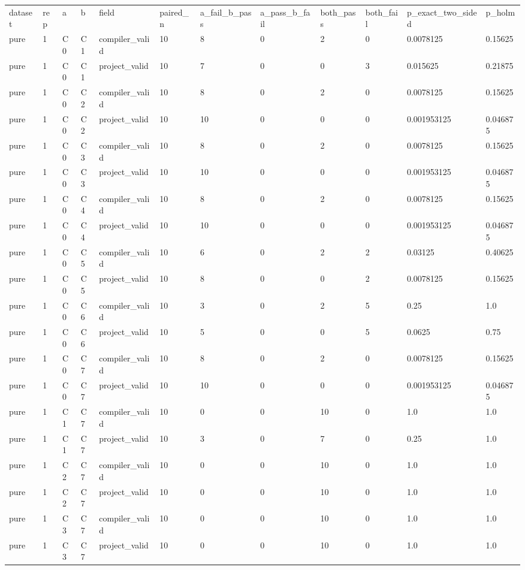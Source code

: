 \begin{tabular}{llllllllllll}
dataset & rep & a & b & field & paired\_n & a\_fail\_b\_pass & a\_pass\_b\_fail & both\_pass & both\_fail & p\_exact\_two\_sided & p\_holm \\
pure & 1 & C0 & C1 & compiler\_valid & 10 & 8 & 0 & 2 & 0 & 0.0078125 & 0.15625 \\
pure & 1 & C0 & C1 & project\_valid & 10 & 7 & 0 & 0 & 3 & 0.015625 & 0.21875 \\
pure & 1 & C0 & C2 & compiler\_valid & 10 & 8 & 0 & 2 & 0 & 0.0078125 & 0.15625 \\
pure & 1 & C0 & C2 & project\_valid & 10 & 10 & 0 & 0 & 0 & 0.001953125 & 0.046875 \\
pure & 1 & C0 & C3 & compiler\_valid & 10 & 8 & 0 & 2 & 0 & 0.0078125 & 0.15625 \\
pure & 1 & C0 & C3 & project\_valid & 10 & 10 & 0 & 0 & 0 & 0.001953125 & 0.046875 \\
pure & 1 & C0 & C4 & compiler\_valid & 10 & 8 & 0 & 2 & 0 & 0.0078125 & 0.15625 \\
pure & 1 & C0 & C4 & project\_valid & 10 & 10 & 0 & 0 & 0 & 0.001953125 & 0.046875 \\
pure & 1 & C0 & C5 & compiler\_valid & 10 & 6 & 0 & 2 & 2 & 0.03125 & 0.40625 \\
pure & 1 & C0 & C5 & project\_valid & 10 & 8 & 0 & 0 & 2 & 0.0078125 & 0.15625 \\
pure & 1 & C0 & C6 & compiler\_valid & 10 & 3 & 0 & 2 & 5 & 0.25 & 1.0 \\
pure & 1 & C0 & C6 & project\_valid & 10 & 5 & 0 & 0 & 5 & 0.0625 & 0.75 \\
pure & 1 & C0 & C7 & compiler\_valid & 10 & 8 & 0 & 2 & 0 & 0.0078125 & 0.15625 \\
pure & 1 & C0 & C7 & project\_valid & 10 & 10 & 0 & 0 & 0 & 0.001953125 & 0.046875 \\
pure & 1 & C1 & C7 & compiler\_valid & 10 & 0 & 0 & 10 & 0 & 1.0 & 1.0 \\
pure & 1 & C1 & C7 & project\_valid & 10 & 3 & 0 & 7 & 0 & 0.25 & 1.0 \\
pure & 1 & C2 & C7 & compiler\_valid & 10 & 0 & 0 & 10 & 0 & 1.0 & 1.0 \\
pure & 1 & C2 & C7 & project\_valid & 10 & 0 & 0 & 10 & 0 & 1.0 & 1.0 \\
pure & 1 & C3 & C7 & compiler\_valid & 10 & 0 & 0 & 10 & 0 & 1.0 & 1.0 \\
pure & 1 & C3 & C7 & project\_valid & 10 & 0 & 0 & 10 & 0 & 1.0 & 1.0 \\

\end{tabular}

